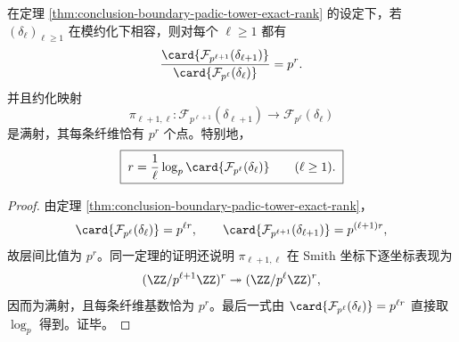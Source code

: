 \begin{corollary}[\(p\)-进边界方程塔的精确斜率刚性]\label{cor:conclusion-boundary-padic-tower-exact-slope-rigidity}
在定理 \ref{thm:conclusion-boundary-padic-tower-exact-rank} 的设定下，若 \((\delta_\ell)_{\ell\ge 1}\) 在模约化下相容，则对每个 \(\ell\ge 1\) 都有
\[
\frac{\card{\mathcal F_{p^{\ell+1}}(\delta_{\ell+1})}}{\card{\mathcal F_{p^\ell}(\delta_\ell)}}=p^r.
\]
并且约化映射
\[
\pi_{\ell+1,\ell}:\mathcal F_{p^{\ell+1}}(\delta_{\ell+1})\longrightarrow \mathcal F_{p^\ell}(\delta_\ell)
\]
是满射，其每条纤维恰有 \(p^r\) 个点。特别地，
\[
\boxed{\;
r=\frac{1}{\ell}\log_p\card{\mathcal F_{p^\ell}(\delta_\ell)}
\qquad(\ell\ge 1).
\;}
\]
\end{corollary}
\begin{proof}
由定理 \ref{thm:conclusion-boundary-padic-tower-exact-rank}，
\[
\card{\mathcal F_{p^\ell}(\delta_\ell)}=p^{\ell r},
\qquad
\card{\mathcal F_{p^{\ell+1}}(\delta_{\ell+1})}=p^{(\ell+1)r},
\]
故层间比值为 \(p^r\)。同一定理的证明还说明
\(
\pi_{\ell+1,\ell}
\)
在 Smith 坐标下逐坐标表现为
\[
(\ZZ/p^{\ell+1}\ZZ)^r\twoheadrightarrow (\ZZ/p^\ell\ZZ)^r,
\]
因而为满射，且每条纤维基数恰为 \(p^r\)。最后一式由
\(
\card{\mathcal F_{p^\ell}(\delta_\ell)}=p^{\ell r}
\)
直接取 \(\log_p\) 得到。证毕。
\end{proof}

